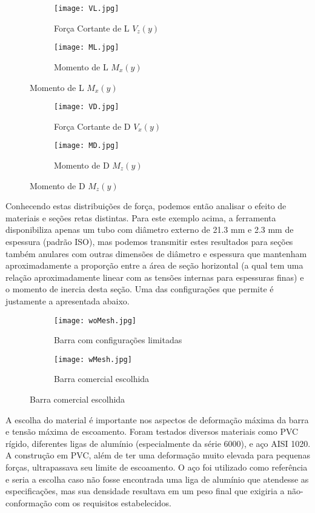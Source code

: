 \documentclass[a4paper]{article}
\begin{document}
\begin{figure}[H]
    \begin{subfigure}[b]{0.48\textwidth}
      \texttt{[image: VL.jpg]}
      \caption*{Força Cortante de L $V_z(y)$}
    \end{subfigure}
    \begin{subfigure}[b]{0.48\textwidth}
      \texttt{[image: ML.jpg]}
      \caption*{Momento de L $M_x(y)$}
    \end{subfigure}
\end{figure}

\begin{figure}[H]
    \begin{subfigure}[b]{0.48\textwidth}
      \texttt{[image: VD.jpg]}
      \caption*{Força Cortante de D $V_x(y)$}
    \end{subfigure}
    \begin{subfigure}[b]{0.48\textwidth}
      \texttt{[image: MD.jpg]}
      \caption*{Momento de D $M_z(y)$}
    \end{subfigure}
\end{figure}

Conhecendo estas distribuições de força, podemos então analisar o efeito de materiais e seções retas distintas. Para este exemplo acima, a ferramenta disponibiliza apenas um tubo com diâmetro externo de 21.3 mm e 2.3 mm de espessura (padrão ISO), mas podemos transmitir estes resultados para seções também anulares com outras dimensões de diâmetro e espessura que mantenham aproximadamente a proporção entre a área de seção horizontal (a qual tem uma relação aproximadamente linear com as tensões internas para espessuras finas) e o momento de inercia desta seção. Uma das configurações que permite é justamente a apresentada abaixo.

\begin{figure}[H]
    \begin{subfigure}[b]{0.48\textwidth}
      \texttt{[image: woMesh.jpg]}
      \caption*{Barra com configurações limitadas}
    \end{subfigure}
    \begin{subfigure}[b]{0.48\textwidth}
      \texttt{[image: wMesh.jpg]}
      \caption*{Barra comercial escolhida}
    \end{subfigure}
\end{figure}

A escolha do material é importante nos aspectos de deformação máxima da barra e tensão máxima de escoamento. Foram testados diversos materiais como PVC rígido, diferentes ligas de alumínio (especialmente da série 6000), e aço AISI 1020. A construção em PVC, além de ter uma deformação muito elevada para pequenas forças, ultrapassava seu limite de escoamento. O aço foi utilizado como referência e seria a escolha caso não fosse encontrada uma liga de alumínio que atendesse as especificações, mas sua densidade resultava em um peso final que exigiria a não-conformação com os requisitos estabelecidos. 
\end{document}
